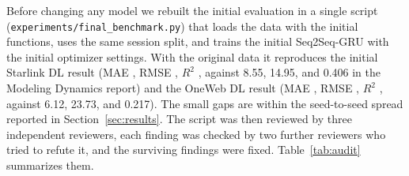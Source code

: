 Before changing any model we rebuilt the initial evaluation in a single script (\texttt{experiments/\allowbreak final\_benchmark.py}) that loads the data with the initial functions, uses the same session split, and trains the initial Seq2Seq-GRU with the initial optimizer settings. With the original data it reproduces the initial Starlink DL result (MAE \ReproSLMAE, RMSE \ReproSLRMSE, $R^2$ \ReproSLRtwo, against 8.55, 14.95, and 0.406 in the Modeling Dynamics report) and the OneWeb DL result (MAE \ReproOWMAE, RMSE \ReproOWRMSE, $R^2$ \ReproOWRtwo, against 6.12, 23.73, and 0.217). The small gaps are within the seed-to-seed spread reported in Section~\ref{sec:results}. The script was then reviewed by three independent reviewers, each finding was checked by two further reviewers who tried to refute it, and the surviving findings were fixed. Table~\ref{tab:audit} summarizes them.

